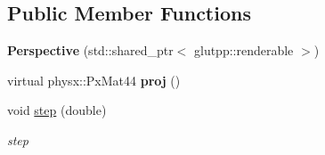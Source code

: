 \subsection*{\-Public \-Member \-Functions}
\begin{DoxyCompactItemize}
\item 
\hypertarget{classglutpp_1_1Camera_1_1Projection_1_1Perspective_ab11e22787e90b3ebd444e32991fb5a7a}{{\bfseries \-Perspective} (std\-::shared\-\_\-ptr$<$ glutpp\-::renderable $>$)}\label{classglutpp_1_1Camera_1_1Projection_1_1Perspective_ab11e22787e90b3ebd444e32991fb5a7a}

\item 
\hypertarget{classglutpp_1_1Camera_1_1Projection_1_1Perspective_a2fec5469b70c19093e4d2932a9ceec0a}{virtual physx\-::\-Px\-Mat44 {\bfseries proj} ()}\label{classglutpp_1_1Camera_1_1Projection_1_1Perspective_a2fec5469b70c19093e4d2932a9ceec0a}

\item 
\hypertarget{classglutpp_1_1Camera_1_1Projection_1_1Perspective_a74771031b253ee639dff1a15e6b9c32d}{void \hyperlink{classglutpp_1_1Camera_1_1Projection_1_1Perspective_a74771031b253ee639dff1a15e6b9c32d}{step} (double)}\label{classglutpp_1_1Camera_1_1Projection_1_1Perspective_a74771031b253ee639dff1a15e6b9c32d}

\begin{DoxyCompactList}\small\item\em step \end{DoxyCompactList}\end{DoxyCompactItemize}
